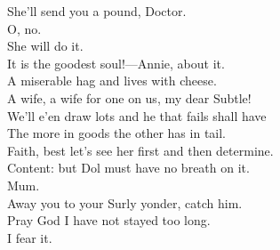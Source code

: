 \documentclass[a4paper,oneside,12pt]{memoir}
\begin{document}
\begin{drama*}
\facespeaks She'll send you a pound, Doctor.\\
\subtlespeaks {} O, no.\\
\facespeaks {} She will do it.\\
It is the goodest soul!---Annie, about it.\\
A miserable hag and lives with cheese.\\
A wife, a wife for one on us, my dear Subtle!\\
We'll e'en draw lots and he that fails shall have\\
The more in goods the other has in tail.\\
\subtlespeaks Faith, best let's see her first and then determine.\\
\facespeaks Content: but Dol must have no breath on it.\\
\subtlespeaks {} Mum.\\
Away you to your Surly yonder, catch him.\\
\facespeaks Pray God I have not stayed too long.\\
\subtlespeaks {} I fear it.\\

\act

\scene


\end{drama*}
\end{document}
